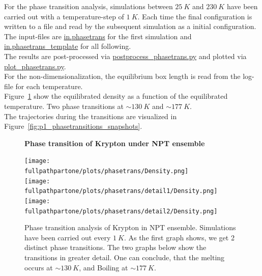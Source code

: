 \documentclass[10pt,a4paper]{report}
\def \pathpartone {../../1_three-dimensional_atomic_system}
\def \fullpathpartone {/home/lukas/Desktop/project/independence/atomistic_modeling/exam/1_three-dimensional_atomic_system}
\newcommand*{\figuretitle}[1]{%
    {\centering%
    \textbf{#1}%
    \par\medskip}%
}
\begin{document}
For the phase transition analysis, simulations between $25~K$ and $230~K$ have been carried out with a temperature-step of $1~K$. Each time the final configuration is written to a file and read by the subsequent simulation as a initial configuration.\\
The input-files are \href{\pathpartone/in.phasetrans}{in.phasetrans} for the first simulation and \href{\pathpartone/in.phasetrans_template}{in.phasetrans\_template} for all following.\\
The results are post-processed via \href{\pathpartone/postprocess_phasetrans.py}{postprocess\_phasetrans.py} and plotted via \href{\pathpartone/plot_phasetrans.py}{plot\_phasetrans.py}.\\
For the non-dimensionalization, the equilibrium box length is read from the log-file for each temperature.\\
Figure~\ref{fig:p1_phasetransition_dens} show the equilibrated density as a function of the equilibrated temperature. Two phase transitions at $\sim130~K$ and $\sim177~K$.\\
The trajectories during the transitions are visualized in Figure~\ref{fig:p1_phasetransitions_snapshots}.



\begin{center}
\begin{figure}[h]
\figuretitle{Phase transition of Krypton under NPT ensemble}
\texttt{[image: \\fullpathpartone/plots/phasetrans/Density.png]}\\
\texttt{[image: \\fullpathpartone/plots/phasetrans/detail1/Density.png]}
\texttt{[image: \\fullpathpartone/plots/phasetrans/detail2/Density.png]}
\caption[Phase transition of Krypton under NPT ensemble]{Phase transition analysis of Krypton in NPT ensemble. Simulations have been carried out every $1~K$. As the first graph shows, we get 2 distinct phase transitions. The two graphs below show the transitions in greater detail. One can conclude, that the melting occurs at $\sim130~K$, and Boiling at $\sim177~K$.}
\label{fig:p1_phasetransition_dens}
\end{figure}
\end{center}
\end{document}
